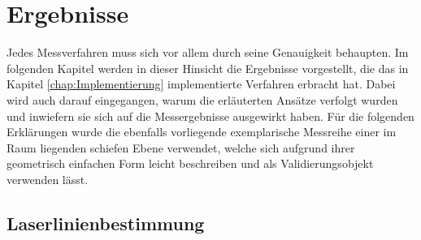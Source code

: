 \chapter{Ergebnisse}
Jedes Messverfahren muss sich vor allem durch seine Genauigkeit behaupten. Im folgenden Kapitel werden in dieser Hinsicht die Ergebnisse vorgestellt, die das in Kapitel \ref{chap:Implementierung} implementierte Verfahren erbracht hat. Dabei wird auch darauf eingegangen, warum die erläuterten Ansätze verfolgt wurden und inwiefern sie sich auf die Messergebnisse ausgewirkt haben. Für die folgenden Erklärungen wurde die ebenfalls vorliegende exemplarische Messreihe einer im Raum liegenden schiefen Ebene verwendet, welche sich aufgrund ihrer geometrisch einfachen Form leicht beschreiben und als Validierungsobjekt verwenden lässt.   

\section{Laserlinienbestimmung}
\label{subsec:segmentierung}


